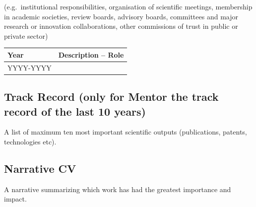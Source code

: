 \documentclass[draftproposal,pncdic]{pncdi-pd}
\begin{document}
\begin{pncdiexplanation}
(e.g.\ institutional responsibilities, organisation of scientific meetings, membership
in academic societies, review boards, advisory boards, committees and major research or
innovation collaborations, other commissions of trust in public or private sector)
\end{pncdiexplanation}

{
\noindent \begin{tabular}{|m{}|m{}|} \hline
\rowcolor{PNCDITableLightGray}
Year & Description -- Role
\\\hline

YYYY-YYYY &
\\\hline
\end{tabular}
}


\subsection*{Track Record (only for Mentor the track record of the last 10 years)}

\begin{pncdiexplanation}
A list of maximum ten most important scientific outputs (publications, patents, technologies etc).
\end{pncdiexplanation}

\subsection*{Narrative CV}

\begin{pncdiexplanation}
A narrative summarizing which work has had the greatest importance and impact.
\end{pncdiexplanation}
\end{document}
